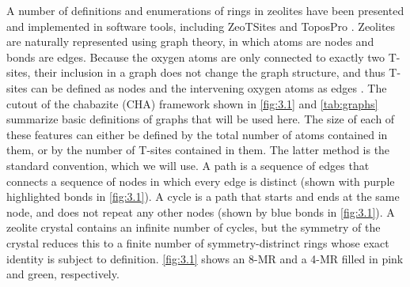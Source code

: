 \documentclass[preprint,numrefs,noinfo,sort&compress]{elsarticle}
\begin{document}
A number of definitions and enumerations of rings in zeolites have been presented   \cite{guttman-ring-1990,goetzke-properties-1991,franzblau-computation-1991,yuan-efficient-2002-1,wooten-structure-2002,le-roux-ring-2010,sastre-zeotsites-2001} and implemented in software tools, including ZeoTSites \cite{sastre-zeotsites-2001} and ToposPro \cite{blatov-applied-2014}. Zeolites are naturally  represented using graph theory, in which  atoms are nodes and bonds are edges.  Because the oxygen atoms are only connected to exactly two T-sites, their inclusion in a graph does not change the graph structure, and thus T-sites can be  defined as nodes and the intervening oxygen atoms as edges \cite{goetzke-properties-1991}.  The cutout of the chabazite (CHA) framework shown in \cref{fig:3.1}  and  \cref{tab:graphs} summarize basic definitions of graphs that will be used here.  The size of each of these features can either be defined by the total number of atoms contained in them, or by the number of T-sites contained in them. The latter method is the standard convention, which we will use. A path is a sequence of edges that connects a sequence of nodes in which every edge is distinct (shown with purple highlighted bonds in \cref{fig:3.1}). A cycle is a path that starts and ends at the same node, and does not repeat any other nodes (shown by blue bonds in \cref{fig:3.1}). A zeolite crystal contains an infinite number of cycles, but the symmetry of the crystal reduces this to a finite number of symmetry-distrinct rings whose exact identity is subject to definition. \cref{fig:3.1} shows an 8-MR and a 4-MR filled in pink and green, respectively.
\end{document}
